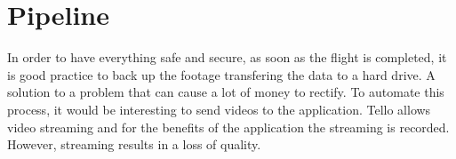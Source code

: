 \section{Pipeline}
\label{sec:pipeline}

In order to have everything safe and secure, as soon as the flight is completed, it is good practice to back up the footage transfering the data to a hard drive. A solution to a problem that can cause a lot of money to rectify. To automate this process, it would be interesting to send videos to the application. Tello allows video streaming and for the benefits of the application the streaming is recorded. However, streaming results in a loss of quality.